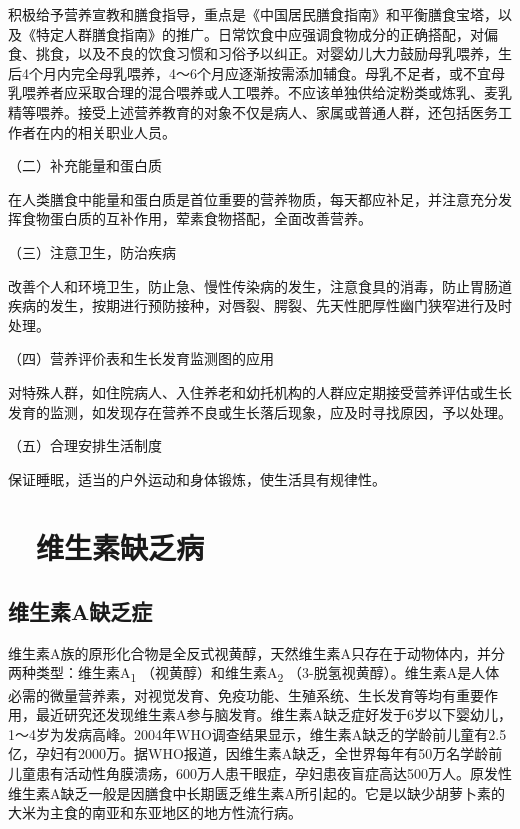 积极给予营养宣教和膳食指导，重点是《中国居民膳食指南》和平衡膳食宝塔，以及《特定人群膳食指南》的推广。日常饮食中应强调食物成分的正确搭配，对偏食、挑食，以及不良的饮食习惯和习俗予以纠正。对婴幼儿大力鼓励母乳喂养，生后4个月内完全母乳喂养，4～6个月应逐渐按需添加辅食。母乳不足者，或不宜母乳喂养者应采取合理的混合喂养或人工喂养。不应该单独供给淀粉类或炼乳、麦乳精等喂养。接受上述营养教育的对象不仅是病人、家属或普通人群，还包括医务工作者在内的相关职业人员。

（二）补充能量和蛋白质

在人类膳食中能量和蛋白质是首位重要的营养物质，每天都应补足，并注意充分发挥食物蛋白质的互补作用，荤素食物搭配，全面改善营养。

（三）注意卫生，防治疾病

改善个人和环境卫生，防止急、慢性传染病的发生，注意食具的消毒，防止胃肠道疾病的发生，按期进行预防接种，对唇裂、腭裂、先天性肥厚性幽门狭窄进行及时处理。

（四）营养评价表和生长发育监测图的应用

对特殊人群，如住院病人、入住养老和幼托机构的人群应定期接受营养评估或生长发育的监测，如发现存在营养不良或生长落后现象，应及时寻找原因，予以处理。

（五）合理安排生活制度

保证睡眠，适当的户外运动和身体锻炼，使生活具有规律性。

\hypertarget{text00003.htmlux5cux23mllj16}{%
\section{　维生素缺乏病}\label{text00003.htmlux5cux23mllj16}}

\hypertarget{text00003.htmlux5cux23mllj17}{%
\subsection{维生素A缺乏症}\label{text00003.htmlux5cux23mllj17}}

维生素A族的原形化合物是全反式视黄醇，天然维生素A只存在于动物体内，并分两种类型：维生素A\textsubscript{1}
（视黄醇）和维生素A\textsubscript{2}
（3-脱氢视黄醇）。维生素A是人体必需的微量营养素，对视觉发育、免疫功能、生殖系统、生长发育等均有重要作用，最近研究还发现维生素A参与脑发育。维生素A缺乏症好发于6岁以下婴幼儿，1～4岁为发病高峰。2004年WHO调查结果显示，维生素A缺乏的学龄前儿童有2.5亿，孕妇有2000万。据WHO报道，因维生素A缺乏，全世界每年有50万名学龄前儿童患有活动性角膜溃疡，600万人患干眼症，孕妇患夜盲症高达500万人。原发性维生素A缺乏一般是因膳食中长期匮乏维生素A所引起的。它是以缺少胡萝卜素的大米为主食的南亚和东亚地区的地方性流行病。

